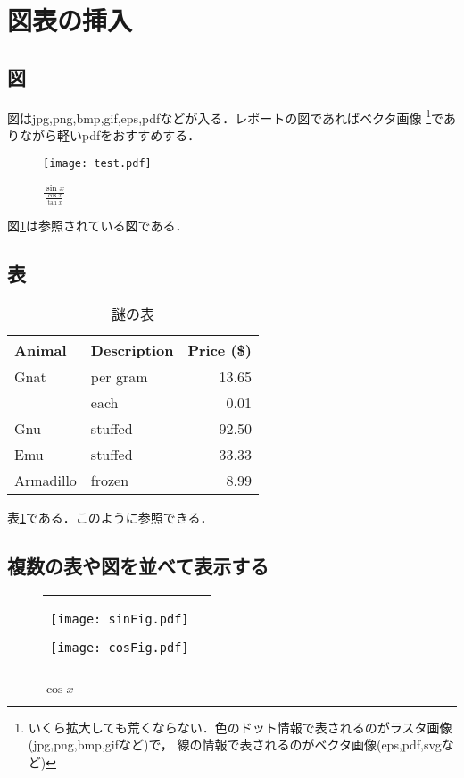 \documentclass[a4j,titlepage]{ltjsarticle}   %
\begin{document}
  \section{図表の挿入}
  \subsection{図}
  図はjpg,png,bmp,gif,eps,pdfなどが入る．レポートの図であればベクタ画像%
  \footnote{いくら拡大しても荒くならない．色のドット情報で表されるのがラスタ画像(jpg,png,bmp,gifなど)で，
  線の情報で表されるのがベクタ画像(eps,pdf,svgなど)}でありながら軽いpdfをおすすめする．
  \begin{figure}[H]
    \centering
    \texttt{[image: test.pdf]}
    \caption{$\frac{\sin{x}}{\frac{\cos{x}}{\tan{x}}}$}
    \label{fig:tri}
  \end{figure}
  図\ref{fig:tri}は参照されている図である．

  \subsection{表}
  \begin{table}[H]
    \centering
    \caption{謎の表}
    \label{tab:testTab}
    \begin{tabular}{|l|l|r|}
      \hline
      Animal      & Description  & Price (\$) \\ \hline
      Gnat        & per gram     & 13.65      \\ \hline
                  & each         & 0.01       \\ \hline
      Gnu         & stuffed      & 92.50      \\ \hline
      Emu         & stuffed      & 33.33      \\ \hline
      Armadillo   & frozen       & 8.99       \\ \hline
    \end{tabular}
  \end{table}
  表\ref{tab:testTab}である．このように参照できる．

  \subsection{複数の表や図を並べて表示する}
  \begin{figure}[H]
    \begin{tabular}{cc}
      \begin{minipage}{0.5\hsize}
        \centering
        \texttt{[image: sinFig.pdf]}
        \caption{$\sin{x}$}
        \label{fig:sin}
      \end{minipage}
      \begin{minipage}{0.5\hsize}
        \centering
        \texttt{[image: cosFig.pdf]}
        \caption{$\cos{x}$}
        \label{fig:cos}
      \end{minipage}
    \end{tabular}
  \end{figure}
\end{document}
